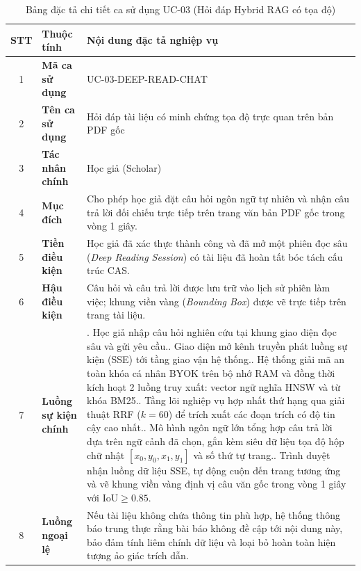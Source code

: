 \begin{table}[htbp]
\centering
\singlespacing
\footnotesize
\renewcommand{\arraystretch}{1.12}
\caption{Bảng đặc tả chi tiết ca sử dụng UC-03 (Hỏi đáp Hybrid RAG có tọa độ)}
\label{tab:uc_03_spec}
\setlength{\tabcolsep}{4pt}
\begin{tabular}{|c|>{\raggedright\arraybackslash}p{2.6cm}|>{\raggedright\arraybackslash}p{10.2cm}|}
\hline
\textbf{STT} & \centering\textbf{Thuộc tính} & \centering\textbf{Nội dung đặc tả nghiệp vụ} \tabularnewline \hline
1 & \textbf{Mã ca sử dụng} & UC-03-DEEP-READ-CHAT \\ \hline
2 & \textbf{Tên ca sử dụng} & Hỏi đáp tài liệu có minh chứng tọa độ trực quan trên bản PDF gốc \\ \hline
3 & \textbf{Tác nhân chính} & Học giả (Scholar) \\ \hline
4 & \textbf{Mục đích} & Cho phép học giả đặt câu hỏi ngôn ngữ tự nhiên và nhận câu trả lời đối chiếu trực tiếp trên trang văn bản PDF gốc trong vòng 1 giây. \\ \hline
5 & \textbf{Tiền điều kiện} & Học giả đã xác thực thành công và đã mở một phiên đọc sâu (\textit{Deep Reading Session}) có tài liệu đã hoàn tất bóc tách cấu trúc CAS. \\ \hline
6 & \textbf{Hậu điều kiện} & Câu hỏi và câu trả lời được lưu trữ vào lịch sử phiên làm việc; khung viền vàng (\textit{Bounding Box}) được vẽ trực tiếp trên trang tài liệu. \\ \hline
7 & \textbf{Luồng sự kiện chính} & 
1. Học giả nhập câu hỏi nghiên cứu tại khung giao diện đọc sâu và gửi yêu cầu.\newline
2. Giao diện mở kênh truyền phát luồng sự kiện (SSE) tới tầng giao vận hệ thống.\newline
3. Hệ thống giải mã an toàn khóa cá nhân BYOK trên bộ nhớ RAM và đồng thời kích hoạt 2 luồng truy xuất: vector ngữ nghĩa HNSW và từ khóa BM25.\newline
4. Tầng lõi nghiệp vụ hợp nhất thứ hạng qua giải thuật RRF ($k=60$) để trích xuất các đoạn trích có độ tin cậy cao nhất.\newline
5. Mô hình ngôn ngữ lớn tổng hợp câu trả lời dựa trên ngữ cảnh đã chọn, gắn kèm siêu dữ liệu tọa độ hộp chữ nhật $[x_0, y_0, x_1, y_1]$ và số thứ tự trang.\newline
6. Trình duyệt nhận luồng dữ liệu SSE, tự động cuộn đến trang tương ứng và vẽ khung viền vàng định vị câu văn gốc trong vòng 1 giây với $\text{IoU} \ge 0.85$. \\ \hline
8 & \textbf{Luồng ngoại lệ} & Nếu tài liệu không chứa thông tin phù hợp, hệ thống thông báo trung thực rằng bài báo không đề cập tới nội dung này, bảo đảm tính liêm chính dữ liệu và loại bỏ hoàn toàn hiện tượng ảo giác trích dẫn. \\ \hline
\end{tabular}
\end{table}

